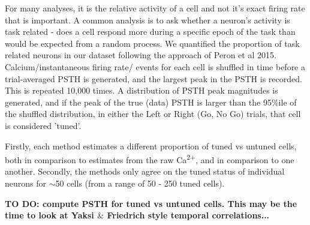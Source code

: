 \documentclass[a4paper]{article}
\begin{document}
For many analyses, it is the relative activity of a cell and not it's exact firing rate that is important. A common analysis is to ask whether a neuron's activity is task related - does a cell respond more during a specific epoch of the task than would be expected from a random process. We quantified the proportion of task related neurons in our dataset following the approach of Peron et al 2015. Calcium/instantaneous firing rate/ events for each cell is shuffled in time before a trial-averaged PSTH is generated, and the largest peak in the PSTH is recorded. This is repeated 10,000 times. A distribution of PSTH peak magnitudes is generated, and if the peak of the true (data) PSTH is larger than the 95\%ile of the shuffled distribution, in either the Left or Right (Go, No Go) trials, that cell is considered 'tuned'.

Firstly, each method estimates a different proportion of tuned vs untuned cells, both in comparison to estimates from the raw Ca\textsuperscript{2+}, and in comparison to one another. Secondly, the methods only agree on the tuned status of individual neurons for $\sim$50 cells (from a range of 50 - 250 tuned cells). 

\textbf{TO DO: compute PSTH for tuned vs untuned cells. This may be the time to look at Yaksi $\&$ Friedrich style temporal correlations...}
\end{document}
